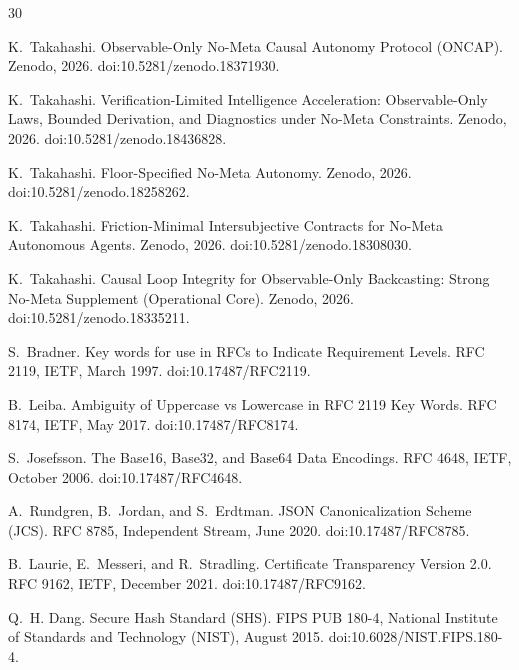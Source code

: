 \documentclass[11pt]{article}
\begin{document}

\begin{thebibliography}{30}

K.~Takahashi.
\newblock Observable-Only No-Meta Causal Autonomy Protocol (ONCAP).
\newblock Zenodo, 2026.
\newblock doi:10.5281/zenodo.18371930.

K.~Takahashi.
\newblock Verification-Limited Intelligence Acceleration: Observable-Only Laws, Bounded Derivation, and Diagnostics under No-Meta Constraints.
\newblock Zenodo, 2026.
\newblock doi:10.5281/zenodo.18436828.

K.~Takahashi.
\newblock Floor-Specified No-Meta Autonomy.
\newblock Zenodo, 2026.
\newblock doi:10.5281/zenodo.18258262.

K.~Takahashi.
\newblock Friction-Minimal Intersubjective Contracts for No-Meta Autonomous Agents.
\newblock Zenodo, 2026.
\newblock doi:10.5281/zenodo.18308030.

K.~Takahashi.
\newblock Causal Loop Integrity for Observable-Only Backcasting: Strong No-Meta Supplement (Operational Core).
\newblock Zenodo, 2026.
\newblock doi:10.5281/zenodo.18335211.

S.~Bradner.
\newblock Key words for use in RFCs to Indicate Requirement Levels.
\newblock RFC 2119, IETF, March 1997.
\newblock doi:10.17487/RFC2119.

B.~Leiba.
\newblock Ambiguity of Uppercase vs Lowercase in RFC 2119 Key Words.
\newblock RFC 8174, IETF, May 2017.
\newblock doi:10.17487/RFC8174.

S.~Josefsson.
\newblock The Base16, Base32, and Base64 Data Encodings.
\newblock RFC 4648, IETF, October 2006.
\newblock doi:10.17487/RFC4648.

A.~Rundgren, B.~Jordan, and S.~Erdtman.
\newblock JSON Canonicalization Scheme (JCS).
\newblock RFC 8785, Independent Stream, June 2020.
\newblock doi:10.17487/RFC8785.

B.~Laurie, E.~Messeri, and R.~Stradling.
\newblock Certificate Transparency Version 2.0.
\newblock RFC 9162, IETF, December 2021.
\newblock doi:10.17487/RFC9162.

Q.~H. Dang.
\newblock Secure Hash Standard (SHS).
\newblock FIPS PUB 180-4, National Institute of Standards and Technology (NIST), August 2015.
\newblock doi:10.6028/NIST.FIPS.180-4.


\end{thebibliography}
\end{document}
